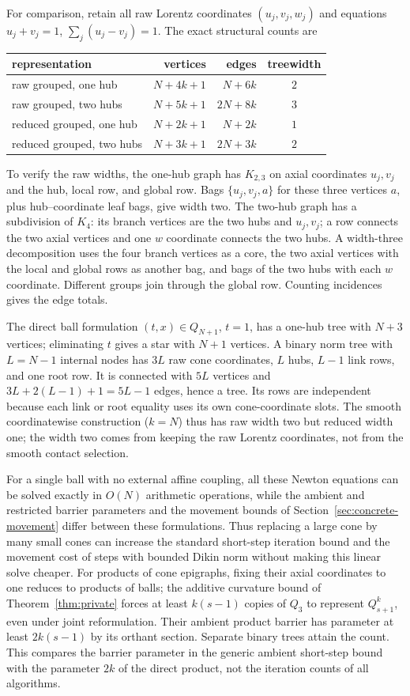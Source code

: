 For comparison, retain all raw Lorentz coordinates $(u_j,v_j,w_j)$
and equations $u_j+v_j=1$, $\sum_j(u_j-v_j)=1$.
The exact structural counts are
\begin{center}
\begin{tabular}{lrrc}
\toprule
representation & vertices & edges & treewidth\\
\midrule
raw grouped, one hub & $N+4k+1$ & $N+6k$ & $2$\\
raw grouped, two hubs & $N+5k+1$ & $2N+8k$ & $3$\\
reduced grouped, one hub & $N+2k+1$ & $N+2k$ & $1$\\
reduced grouped, two hubs & $N+3k+1$ & $2N+3k$ & $2$\\
\bottomrule
\end{tabular}
\end{center}
To verify the raw widths, the one-hub graph has $K_{2,3}$ on axial
coordinates $u_j,v_j$ and the hub, local row, and global row.  Bags
$\{u_j,v_j,a\}$ for these three vertices $a$, plus hub--coordinate
leaf bags, give width two.  The two-hub graph has a subdivision of $K_4$:
its branch vertices are the two hubs and $u_j,v_j$; a row connects the
two axial vertices and one $w$ coordinate connects the two hubs.
A width-three decomposition uses the four branch vertices as a core,
the two axial vertices with the local and global rows as another bag,
and bags of the two hubs with each $w$ coordinate.  Different groups
join through the global row.  Counting incidences gives the edge totals.

The direct ball formulation $(t,x)\in Q_{N+1}$, $t=1$, has a one-hub
tree with $N+3$ vertices; eliminating $t$ gives a star with $N+1$
vertices.  A binary norm tree with $L=N-1$ internal nodes has $3L$
raw cone coordinates, $L$ hubs, $L-1$ link rows, and one root row.
It is connected with $5L$ vertices and $3L+2(L-1)+1=5L-1$ edges,
hence a tree.  Its rows are independent because each link or root
equality uses its own cone-coordinate slots.  The smooth coordinatewise
construction ($k=N$) thus has raw width two but reduced width one; the
width two comes from keeping the raw Lorentz coordinates, not from the
smooth contact selection.

For a single ball with no external affine coupling, all these Newton
equations can be solved exactly in $O(N)$ arithmetic operations, while
the ambient and restricted barrier parameters and the movement bounds of
Section~\ref{sec:concrete-movement} differ between these formulations.
Thus replacing a large cone by many small cones can
increase the standard short-step iteration bound and the movement cost
of steps with bounded Dikin norm without making this linear solve cheaper.
For products of cone epigraphs, fixing their axial coordinates to one
reduces to products of balls; the additive curvature bound of
Theorem~\ref{thm:private} forces
at least $k(s-1)$ copies of $Q_3$ to represent $Q_{s+1}^k$, even under
joint reformulation.  Their ambient product barrier has parameter at
least $2k(s-1)$ by its orthant section.  Separate binary trees attain the
count.  This compares the barrier parameter in the generic ambient
short-step bound with the parameter $2k$ of the direct product, not the
iteration counts of all algorithms.

